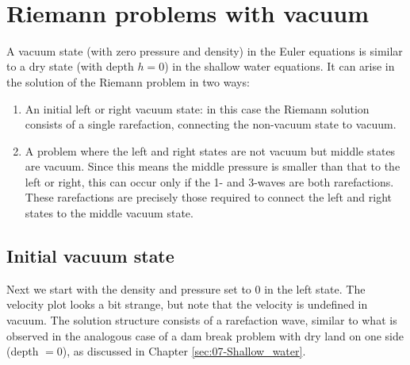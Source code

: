 \documentclass{SIAMbook2016}
\providecommand{\tightlist}{%
      \setlength{\itemsep}{0pt}\setlength{\parskip}{0pt}}
\begin{document}
    \begin{center}
    \end{center}
    { \hspace*{\fill} \\}
    
\hypertarget{riemann-problems-with-vacuum}{%
\section{Riemann problems with
vacuum}\label{riemann-problems-with-vacuum}}

A vacuum state (with zero pressure and density) in the Euler equations
is similar to a dry state (with depth \(h=0\)) in the shallow water
equations. It can arise in the solution of the Riemann problem in two
ways:

\begin{enumerate}
\def\labelenumi{\arabic{enumi}.}
\tightlist
\item
  An initial left or right vacuum state: in this case the Riemann
  solution consists of a single rarefaction, connecting the non-vacuum
  state to vacuum.
\item
  A problem where the left and right states are not vacuum but middle
  states are vacuum. Since this means the middle pressure is smaller
  than that to the left or right, this can occur only if the 1- and
  3-waves are both rarefactions. These rarefactions are precisely those
  required to connect the left and right states to the middle vacuum
  state.
\end{enumerate}

\hypertarget{initial-vacuum-state}{%
\subsection{Initial vacuum state}\label{initial-vacuum-state}}

Next we start with the density and pressure set to 0 in the left state.
The velocity plot looks a bit strange, but note that the velocity is
undefined in vacuum. The solution structure consists of a rarefaction
wave, similar to what is observed in the analogous case of a dam break
problem with dry land on one side (depth \(=0\)), as discussed in
Chapter \ref{sec:07-Shallow_water}.
\end{document}
